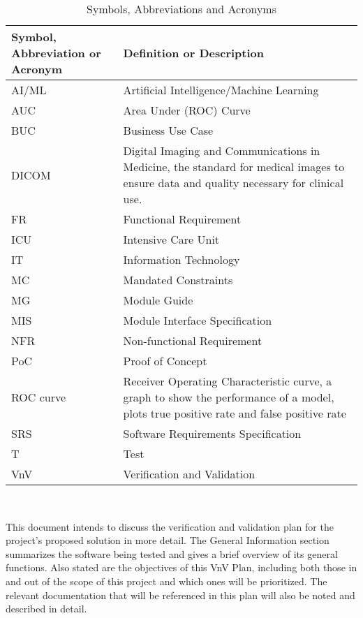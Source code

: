 \documentclass[12pt, titlepage]{article}
\begin{document}
\renewcommand{\arraystretch}{1.2}
\begin{table}[h]
    \centering
    \begin{tabular}{p{1.25in}p{3.75in}}
        \toprule
        \textbf{Symbol, Abbreviation or Acronym} & \textbf{Definition or Description} \\
        \midrule
        AI/ML & Artificial Intelligence/Machine Learning \\
        AUC & Area Under (ROC) Curve \\
        BUC & Business Use Case \\
        DICOM & Digital Imaging and Communications in Medicine, the standard for medical images to ensure data and quality necessary for clinical use.\\
        FR & Functional Requirement \\
        ICU & Intensive Care Unit \\
        IT & Information Technology \\
        MC & Mandated Constraints \\
        MG & Module Guide \\
        MIS & Module Interface Specification \\
        NFR & Non-functional Requirement \\
        PoC & Proof of Concept\\
        ROC curve & Receiver Operating Characteristic curve, a graph to show the performance of a model, plots true positive rate and false positive rate \\
        SRS & Software Requirements Specification \\
        T & Test \\
        VnV & Verification and Validation \\
        \bottomrule
    \end{tabular}\\
    \caption{Symbols, Abbreviations and Acronyms}
    \label{tab:symbsAbbrevsAcros}
\end{table}

\newpage


\noindent This document intends to discuss the verification and validation plan for the project's proposed solution in more detail. The General Information section summarizes the software being tested and gives a brief overview of its general functions. Also stated are the objectives of this VnV Plan, including both those in and out of the scope of this project and which ones will be prioritized. The relevant documentation that will be referenced in this plan will also be noted and described in detail.
\end{document}
